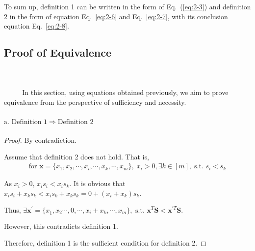 \documentclass[oneside,solution]{seu-ml-assign}
\begin{document}
To sum up, definition 1 can be written in the form of Eq.~(\ref{eq:2-3}) and
definition 2 in the form of equation Eq.~\eqref{eq:2-6} and Eq.~\eqref{eq:2-7}, with its conclusion equation Eq.~\eqref{eq:2-8}.
\subsection{Proof of Equivalence}
\\ \hspace*{\fill} \\
$\text{        }\quad\text{  }$
In this section, using equations obtained previously, we aim to prove
equivalence from the perspective of sufficiency and necessity.
\paragraph{\(\text{a. Definition }1\Rightarrow \text{Definition } 2\)}
\begin{proof}
By contradiction. 

Assume that definition 2 does not hold. That is,
\begin{equation}
\begin{aligned}
\text{for }\mathbf{x} =\{x_1,x_2,\cdots,x_i,\cdots,x_k,\cdots,x_m\},\;x_i >0,
\exists k\in [m],\;\text{s.t. } s_i < s_k 
\end{aligned}
\end{equation}

As \(x_i>0\), \(x_is_i < x_i s_k\). It is obvious that
\( x_is_i+x_ks_k<x_is_k+x_ks_k=0+(x_i+x_k)s_k\).

Thus,
\(\exists \mathbf{x}^{'}=\{x_1^{},x_2\cdots,0,\cdots,x_i+x_k,\cdots,x_m\},\text{ s.t. }\mathbf{x}^{T}\mathbf{S}<\mathbf{x}^{'T}\mathbf{S}\).

However, this contradicts definition 1. 

Therefore, definition 1 is the sufficient condition for definition 2.
\end{proof}
\end{document}
